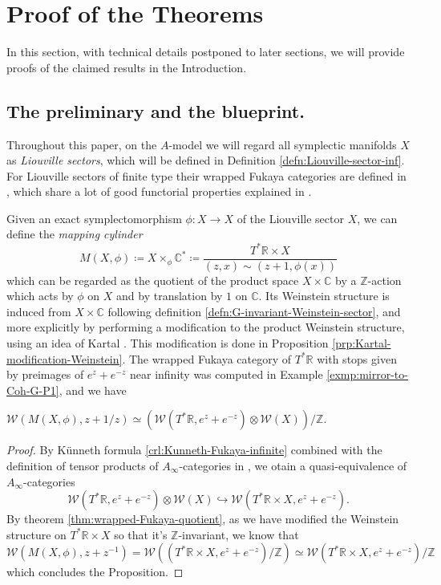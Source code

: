 \section{Proof of the Theorems\label{sec:proof-of-theorems}}
In this section, with technical details postponed to later sections, we will provide proofs of the claimed results in the Introduction.
\subsection{The preliminary and the blueprint.} Throughout this paper, on the $A$-model we will regard all symplectic manifolds $X$ as \emph{Liouville sectors}, which will be defined in Definition \ref{defn:Liouville-sector-inf}. For Liouville sectors of finite type their wrapped Fukaya categories are defined in \cite{GPS20}, which share a lot of good functorial properties explained in \cite{GPS24S}.\par
Given an exact symplectomorphism $\phi\colon X\to X$ of the Liouville sector $X$, we can define the \emph{mapping cylinder} \[
    M (X,\phi )\coloneqq X\times_{\phi}\mathbb{C}^{\ast}\coloneqq\frac{T^{\ast}\mathbb{R}\times X}{(z,x)\sim (z+1,\phi (x))}
\]which can be regarded as the quotient of the product space $X\times\mathbb{C}$ by a $\mathbb{Z}$-action which acts by $\phi$ on $X$ and by translation by $1$ on $\mathbb{C}$. Its Weinstein structure is induced from $X\times\mathbb{C}$ following definition \ref{defn:G-invariant-Weinstein-sector}, and more explicitly by performing a modification to the product Weinstein structure, using an idea of Kartal \cite{Kartal21}. This modification is done in Proposition \ref{prp:Kartal-modification-Weinstein}. The wrapped Fukaya category of $T^{\ast}\mathbb{R}$ with stops given by preimages of $e^z+e^{-z}$ near infinity was computed in Example \ref{exmp:mirror-to-Coh-G-P1}, and we have
\begin{prp}\label{prp:Fukaya-cat-mapping-cylinder}
    $\mathcal{W} (M(X,\phi),z+1/z)\simeq\left(\mathcal{W} (T^{\ast}\mathbb{R}, e^z+e^{-z})\otimes\mathcal{W} (X)\right)/\mathbb{Z}$.
\end{prp}
\begin{proof}
    By Künneth formula \ref{crl:Kunneth-Fukaya-infinite} combined with the definition of tensor products of $A_{\infty}$-categories in \cite{Ornaghi25}, we otain a quasi-equivalence of $A_{\infty}$-categories \[
        \mathcal{W} (T^{\ast}\mathbb{R},e^z+e^{-z})\otimes\mathcal{W} (X)\hookrightarrow\mathcal{W} (T^{\ast}\mathbb{R}\times X, e^z+e^{-z}).
    \]By theorem \ref{thm:wrapped-Fukaya-quotient}, as we have modified the Weinstein structure on $T^{\ast}\mathbb{R}\times X$ so that it's $\mathbb{Z}$-invariant, we know that \[
        \mathcal{W} (M(X,\phi),z+z^{-1})=\mathcal{W}\left((T^{\ast}\mathbb{R}\times X,e^z+e^{-z})/\mathbb{Z}\right)\simeq\mathcal{W} (T^{\ast}\mathbb{R}\times X,e^z+e^{-z})/\mathbb{Z}
    \]which concludes the Proposition.
\end{proof}
